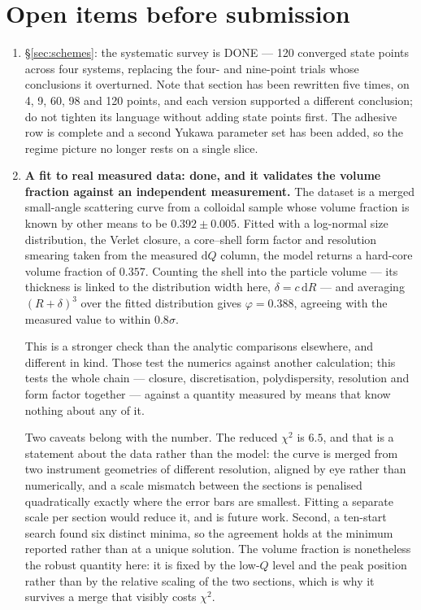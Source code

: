 \documentclass[11pt,a4paper]{article}
\begin{document}
\section*{Open items before submission}
\begin{enumerate}\itemsep1pt
\item \S\ref{sec:schemes}: the systematic survey is DONE --- 120 converged
state points across four systems, replacing the four- and nine-point trials
whose conclusions it overturned. Note that section has been rewritten five
times, on 4, 9, 60, 98 and 120 points, and each version supported a different
conclusion; do not tighten its language without adding state points first.
The adhesive row is complete and a second Yukawa parameter set has been
added, so the regime picture no longer rests on a single slice.
\item \textbf{A fit to real measured data: done, and it validates the
volume fraction against an independent measurement.} The dataset is a merged
small-angle scattering curve from a colloidal sample whose volume fraction is
known by other means to be $0.392 \pm 0.005$. Fitted with a log-normal size
distribution, the Verlet closure, a core--shell form factor and resolution
smearing taken from the measured $\mathrm{d}Q$ column, the model returns a
hard-core volume fraction of $0.357$. Counting the shell into the particle
volume --- its thickness is linked to the distribution width here,
$\delta = c\,\mathrm{d}R$ --- and averaging $(R+\delta)^3$ over the fitted
distribution gives $\varphi = 0.388$, agreeing with the measured value to
within $0.8\sigma$.

This is a stronger check than the analytic comparisons elsewhere, and
different in kind. Those test the numerics against another calculation; this
tests the whole chain --- closure, discretisation, polydispersity, resolution
and form factor together --- against a quantity measured by means that know
nothing about any of it.

Two caveats belong with the number. The reduced $\chi^2$ is $6.5$, and that
is a statement about the data rather than the model: the curve is merged from
two instrument geometries of different resolution, aligned by eye rather than
numerically, and a scale mismatch between the sections is penalised
quadratically exactly where the error bars are smallest. Fitting a separate
scale per section would reduce it, and is future work. Second, a ten-start
search found six distinct minima, so the agreement holds at the minimum
reported rather than at a unique solution. The volume fraction is
nonetheless the robust quantity here: it is fixed by the low-$Q$ level and
the peak position rather than by the relative scaling of the two sections,
which is why it survives a merge that visibly costs $\chi^2$.


\end{enumerate}
\end{document}
